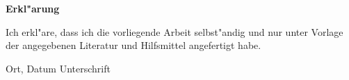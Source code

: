 

\chapter*{}



\textbf{Erkl"arung}

\vspace{10mm}

Ich erkl"are, dass ich die vorliegende Arbeit selbst"andig und nur unter Vorlage der angegebenen Literatur und Hilfsmittel angefertigt habe.

\vspace{30mm}

Ort, Datum \hspace{150pt} Unterschrift

\clearpage
